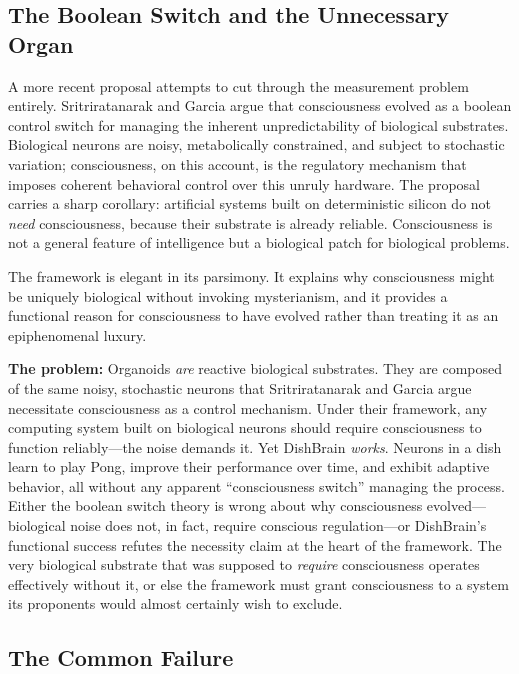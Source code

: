 \subsection{The Boolean Switch and the Unnecessary Organ}

A more recent proposal attempts to cut through the measurement problem entirely. Sritriratanarak and Garcia \cite{sritriratanarak2025consciousness} argue that consciousness evolved as a boolean control switch for managing the inherent unpredictability of biological substrates. Biological neurons are noisy, metabolically constrained, and subject to stochastic variation; consciousness, on this account, is the regulatory mechanism that imposes coherent behavioral control over this unruly hardware. The proposal carries a sharp corollary: artificial systems built on deterministic silicon do not \textit{need} consciousness, because their substrate is already reliable. Consciousness is not a general feature of intelligence but a biological patch for biological problems.

The framework is elegant in its parsimony. It explains why consciousness might be uniquely biological without invoking mysterianism, and it provides a functional reason for consciousness to have evolved rather than treating it as an epiphenomenal luxury.

\textbf{The problem:} Organoids \textit{are} reactive biological substrates. They are composed of the same noisy, stochastic neurons that Sritriratanarak and Garcia argue necessitate consciousness as a control mechanism. Under their framework, any computing system built on biological neurons should require consciousness to function reliably---the noise demands it. Yet DishBrain \textit{works}. Neurons in a dish learn to play Pong, improve their performance over time, and exhibit adaptive behavior, all without any apparent ``consciousness switch'' managing the process. Either the boolean switch theory is wrong about why consciousness evolved---biological noise does not, in fact, require conscious regulation---or DishBrain's functional success refutes the necessity claim at the heart of the framework. The very biological substrate that was supposed to \textit{require} consciousness operates effectively without it, or else the framework must grant consciousness to a system its proponents would almost certainly wish to exclude.

\subsection{The Common Failure}

